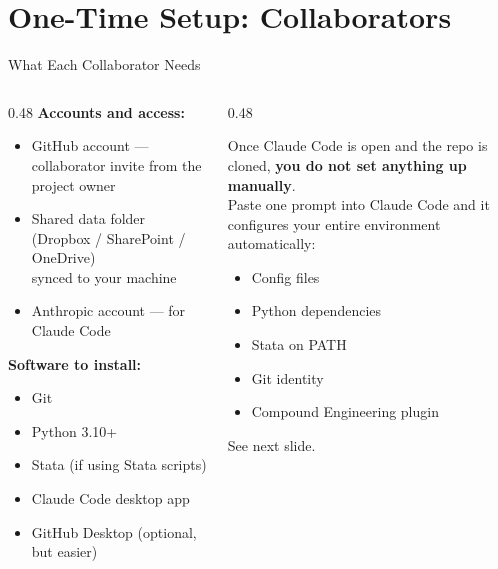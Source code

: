 \documentclass[aspectratio=169,11pt,dvipsnames]{beamer}
\begin{document}
\section{One-Time Setup: Collaborators}

\begin{frame}{What Each Collaborator Needs}
  \begin{columns}[T]
  \scriptsize
    \begin{column}{0.48\textwidth}
      \textbf{Accounts and access:}
      \begin{itemize}
        \item GitHub account — collaborator invite from the project owner
        \item Shared data folder (Dropbox / SharePoint / OneDrive)\\
              synced to your machine
        \item Anthropic account — for Claude Code
      \end{itemize}
      \vspace{0.3cm}
      \textbf{Software to install:}
      \begin{itemize}
        \item Git
        \item Python 3.10+
        \item Stata (if using Stata scripts)
        \item Claude Code desktop app
        \item GitHub Desktop (optional, but easier)
      \end{itemize}
    \end{column}
    \begin{column}{0.48\textwidth}
      \begin{greenbox}[title=\faLightbulb\ The onboarding shortcut]
        Once Claude Code is open and the repo is cloned,
        \textbf{you do not set anything up manually}.\\[0.4cm]
        Paste one prompt into Claude Code and it
        configures your entire environment automatically:\\[0.2cm]
        \begin{itemize}
          \item Config files
          \item Python dependencies
          \item Stata on PATH
          \item Git identity
          \item Compound Engineering plugin
        \end{itemize}
        See next slide.
      \end{greenbox}
    \end{column}
  \end{columns}
\end{frame}
\end{document}
